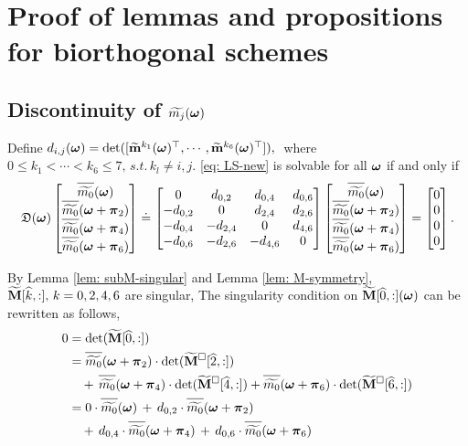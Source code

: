 \section{Proof of lemmas and propositions for biorthogonal schemes}\label{app: lemmas}

\subsection{Discontinuity of $\widetilde{m_{j}}(\boldsymbol{\omega})$}\label{app: discontinuity}
\begin{lemma}\label{lem: subM-singular-sys}
Define $d_{i,j}(\boldsymbol{\omega}) = \det([\widetilde{\mathbf{m}}^{k_1}(\boldsymbol{\omega})^\top,\cdots,\widetilde{\mathbf{m}}^{k_6}(\boldsymbol{\omega})^\top]),\;$ where $0\leq k_1<\cdots<k_6\leq 7,\, s.t.\, k_l\neq i,j.$
\eqref{eq: LS-new} is solvable for all $\boldsymbol{\omega}$ if and only if \vspace{.5em}
\begin{align}
\label{eq: singular-cond}
\mathfrak{D}(\V{\omega})\begin{bmatrix}
\sbarm{0}\\
\sbarmp{0}{2}\\
\sbarmp{0}{4}\\
\sbarmp{0}{6}
\end{bmatrix}
\doteq
\begin{bmatrix}
0 & d_{0,2} & d_{0,4} & d_{0,6}\\
-d_{0,2} & 0 & d_{2,4} & d_{2,6}\\
-d_{0,4} & -d_{2,4} & 0 & d_{4,6}\\
-d_{0,6} & -d_{2,6} & -d_{4,6} & 0
\end{bmatrix}
\begin{bmatrix}
\sbarm{0}\\
\sbarmp{0}{2}\\
\sbarmp{0}{4}\\
\sbarmp{0}{6}
\end{bmatrix}
= \begin{bmatrix}
0\\0\\0\\0
\end{bmatrix}.
\end{align}
\end{lemma}
By Lemma \ref{lem: subM-singular} and Lemma \ref{lem: M-symmetry},  $\widetilde{\mathbf{M}}[\widehat{k},:],\,k=0,2,4,6$ are singular,
The singularity condition on  $\widetilde{\mathbf{M}}[\widehat{0},:](\boldsymbol{\omega})$ can be rewritten as follows,
\begin{align}\label{eq: singular-omega}
0 &=\det(\M[\widehat{0},:]) \notag\\
&=  \sbarmp{0}{2}\cdot\det(\Msub[\widehat{2},:])\notag\\
&\quad+ \,\sbarmp{0}{4}\cdot\det(\Msub[\widehat{4},:])
+ \sbarmp{0}{6}\cdot\det(\Msub[\widehat{6},:])\notag\\
&= 0\cdot\sbarm{0}\,+\,d_{0,2}\cdot\sbarmp{0}{2} \notag\\
&\quad+\,d_{0,4}\cdot \sbarmp{0}{4}\,+\, d_{0,6}\cdot\sbarmp{0}{6}
\end{align}
